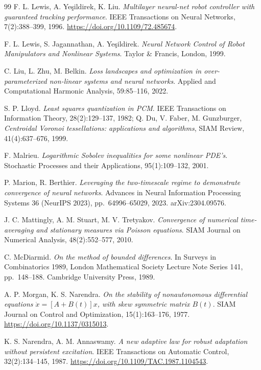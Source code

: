 \begin{thebibliography}{99}
F. L. Lewis, A. Ye\c{s}ildirek, K. Liu.
\emph{Multilayer neural-net robot controller with guaranteed tracking performance}.
IEEE Transactions on Neural Networks, 7(2):388--399, 1996.
\url{https://doi.org/10.1109/72.485674}.

F. L. Lewis, S. Jagannathan, A. Ye\c{s}ildirek.
\emph{Neural Network Control of Robot Manipulators and Nonlinear Systems}.
Taylor \& Francis, London, 1999.

C. Liu, L. Zhu, M. Belkin.
\emph{Loss landscapes and optimization in over-parameterized non-linear systems and neural networks}.
Applied and Computational Harmonic Analysis, 59:85--116, 2022.

S. P. Lloyd.
\emph{Least squares quantization in PCM}.
IEEE Transactions on Information Theory, 28(2):129--137, 1982;
Q. Du, V. Faber, M. Gunzburger, \emph{Centroidal Voronoi tessellations: applications and algorithms},
SIAM Review, 41(4):637--676, 1999.

F. Malrieu.
\emph{Logarithmic Sobolev inequalities for some nonlinear PDE's}.
Stochastic Processes and their Applications, 95(1):109--132, 2001.

P. Marion, R. Berthier.
\emph{Leveraging the two-timescale regime to demonstrate convergence of neural networks}.
Advances in Neural Information Processing Systems 36 (NeurIPS 2023), pp.~64996--65029, 2023.
arXiv:2304.09576.

J. C. Mattingly, A. M. Stuart, M. V. Tretyakov.
\emph{Convergence of numerical time-averaging and stationary measures via Poisson equations}.
SIAM Journal on Numerical Analysis, 48(2):552--577, 2010.

C. McDiarmid.
\emph{On the method of bounded differences}.
In Surveys in Combinatorics 1989, London Mathematical Society Lecture Note Series 141, pp.~148--188. Cambridge
University Press, 1989.

A. P. Morgan, K. S. Narendra.
\emph{On the stability of nonautonomous differential equations $\dot x = [A + B(t)]x$, with skew symmetric
matrix $B(t)$}.
SIAM Journal on Control and Optimization, 15(1):163--176, 1977.
\url{https://doi.org/10.1137/0315013}.

K. S. Narendra, A. M. Annaswamy.
\emph{A new adaptive law for robust adaptation without persistent excitation}.
IEEE Transactions on Automatic Control, 32(2):134--145, 1987.
\url{https://doi.org/10.1109/TAC.1987.1104543}.


\end{thebibliography}
